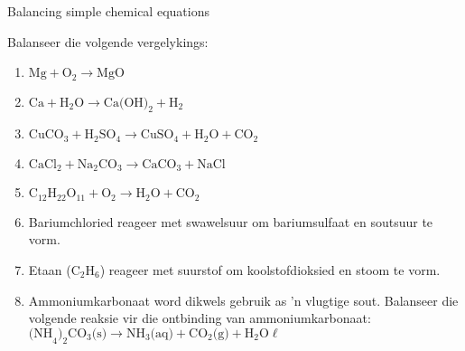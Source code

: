     \noindent

\begin{exercises}{Balancing simple chemical equations}
{
            \nopagebreak
Balanseer die volgende vergelykings:
\begin{enumerate}[noitemsep, label=\textbf{\arabic*}. ] 

\item  $\text{Mg} + {\text{O}}_{2} \to \text{MgO}$

\item ${\text{Ca}}+{\text{H}}_{2}\text{O} \to \text{Ca(OH)}_{2} + \text{H}_{2}$

\item ${\text{CuCO}}_{3} + {\text{H}}_{2}{\text{SO}}_{4} \to \text{CuSO}_{4} + {\text{H}}_{2}\text{O} + {\text{CO}}_{2}$

\item $\text{CaCl}_{2} + {\text{Na}}_{2}{\text{CO}}_{3} \to \text{CaCO}_{3} + {\text{NaCl}}$

\item ${\text{C}}_{12}{\text{H}}_{22}{\text{O}}_{11} + \text{O}_{2} \to \text{H}_{2}\text{O} + \text{CO}_{2}$

\item Bariumchloried reageer met swawelsuur om bariumsulfaat en soutsuur te vorm.

\item Etaan (${\text{C}}_{2}{\text{H}}_{6}$) reageer met suurstof om koolstofdioksied en stoom te vorm.

\item Ammoniumkarbonaat word dikwels gebruik as 'n vlugtige sout. Balanseer die volgende reaksie vir die ontbinding van ammoniumkarbonaat: ${\text{(NH}_{4}{\text{)}}_{2}{\text{CO}}_{3} \text{(s)} \to {\text{NH}}_{3}\text{(aq)} + {\text{CO}}_{2} \text{(g)} + {\text{H}}_{2}\text{O} \ell}$


\end{enumerate}}
\end{exercises}
